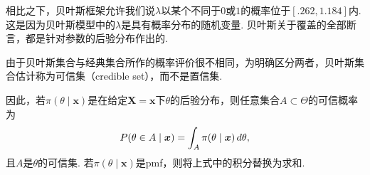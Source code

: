 相比之下，贝叶斯框架允许我们说$\lambda$以某个不同于$0$或$1$的概率位于$[.262,1.184]$内. 这是因为贝叶斯模型中的$\lambda$是具有概率分布的随机变量. 贝叶斯关于覆盖的全部断言，都是针对参数的后验分布作出的.

由于贝叶斯集合与经典集合所作的概率评价很不相同，为明确区分两者，贝叶斯集合估计称为可信集（credible set），而不是置信集.

因此，若$\pi(\theta\mid\boldsymbol x)$是在给定$\boldsymbol X=\boldsymbol x$下$\theta$的后验分布，则任意集合$A\subset\Theta$的可信概率为
\begin{equation}\label{eq:9.2.18}\index{SI0235@可信集（另见置信集；置信区间；置信程序）}
P(\theta\in A\mid\boldsymbol x)=\int_A\pi(\theta\mid\boldsymbol x)\,d\theta,
\end{equation}
且$A$是$\theta$的可信集. 若$\pi(\theta\mid\boldsymbol x)$是pmf，则将上式中的积分替换为求和.


